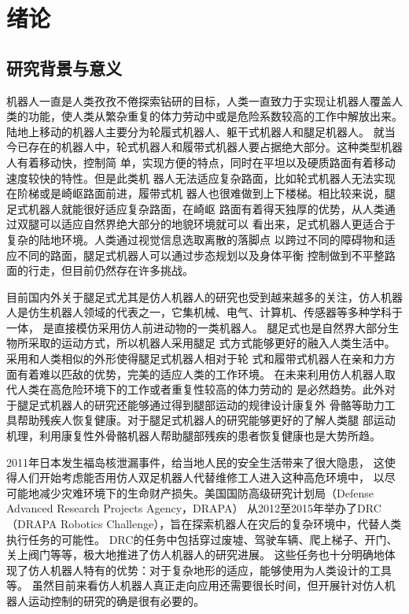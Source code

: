 \newcommand{\aref}[1]{\autoref{#1}\space}
\renewcommand{\algorithmcfname}{算法}
\chapter{绪论}
\section{研究背景与意义}
机器人一直是人类孜孜不倦探索钻研的目标，人类一直致力于实现让机器人覆盖人
类的功能，使人类从繁杂重复的体力劳动中或是危险系数较高的工作中解放出来。
陆地上移动的机器人主要分为轮履式机器人、躯干式机器人和腿足机器人。
就当今已存在的机器人中，轮式机器人和履带式机器人要占据绝大部分。这种类型机器人有着移动快，控制简
单，实现方便的特点，同时在平坦以及硬质路面有着移动速度较快的特性。但是此类机
器人无法适应复杂路面，比如轮式机器人无法实现在阶梯或是崎岖路面前进，履带式机
器人也很难做到上下楼梯。相比较来说，腿足式机器人就能很好适应复杂路面，在崎岖
路面有着得天独厚的优势，从人类通过双腿可以适应自然界绝大部分的地貌环境就可以
看出来，足式机器人更适合于复杂的陆地环境\cite{Schraft2000ServiceR}。人类通过视觉信息选取离散的落脚点
以跨过不同的障碍物和适应不同的路面，腿足式机器人可以通过步态规划以及身体平衡
控制做到不平整路面的行走，但目前仍然存在许多挑战。

目前国内外关于腿足式尤其是仿人机器人的研究也受到越来越多的关注，仿人机器
人是仿生机器人领域的代表之一，它集机械、电气、计算机、传感器等多种学科于一体，
是直接模仿采用仿人前进动物的一类机器人\cite{梶田秀司2007仿人机器人}。
腿足式也是自然界大部分生物所采取的运动方式，所以机器人采用腿足
式方式能够更好的融入人类生活中。采用和人类相似的外形使得腿足式机器人相对于轮
式和履带式机器人在亲和力方面有着难以匹敌的优势，完美的适应人类的工作环境\cite{2010067776.nh}。
在未来利用仿人机器人取代人类在高危险环境下的工作或者重复性较高的体力劳动的
是必然趋势。此外对于腿足式机器人的研究还能够通过得到腿部运动的规律设计康复外
骨骼等助力工具帮助残疾人恢复健康。对于腿足式机器人的研究能够更好的了解人类腿
部运动机理，利用康复性外骨骼机器人帮助腿部残疾的患者恢复健康也是大势所趋。

2011年日本发生福岛核泄漏事件，给当地人民的安全生活带来了很大隐患，
这使得人们开始考虑能否用仿人双足机器人代替维修工人进入这种高危环境中，
以尽可能地减少灾难环境下的生命财产损失。美国国防高级研究计划局（Defense Advanced Research Projects Agency，DRAPA）
从2012至2015年举办了DRC（DRAPA Robotics Challenge），旨在探索机器人在灾后的复杂环境中，代替人类执行任务的可能性。
DRC的任务中包括穿过废墟、驾驶车辆、爬上梯子、开门、关上阀门等等，极大地推进了仿人机器人的研究进展。
这些任务也十分明确地体现了仿人机器人特有的优势：对于复杂地形的适应，能够使用为人类设计的工具等。
虽然目前来看仿人机器人真正走向应用还需要很长时间，但开展针对仿人机器人运动控制的研究的确是很有必要的。
